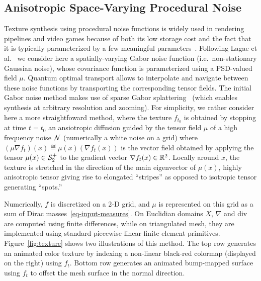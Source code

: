 
\subsection{Anisotropic Space-Varying Procedural Noise}




Texture synthesis using procedural noise functions is widely used in rendering pipelines and video games because of both its low storage cost and the fact that it is typically parameterized by a few meaningful parameters~\cite{LagaeSurvey}. 
%
Following Lagae et al.~ we consider here a spatially-varying Gabor noise function (i.e.\ non-stationary Gaussian noise), whose covariance function is parameterized using a PSD-valued field $\mu$. 
%
Quantum optimal transport allows to interpolate and navigate between these noise functions by transporting the corresponding tensor fields. 
%
The initial Gabor noise method makes use of sparse Gabor splattering~\cite{LagaeSurvey} (which enables synthesis at arbitrary resolution and zooming). For simplicity, we rather consider here a more straightfoward method, where the texture $f_{t_0}$ is obtained by stopping at time $t=t_0$ an ansiotropic diffusion guided by the tensor field $\mu$  of a high frequency noise $\mathcal{N}$ (numerically a white noise on a grid)
where $(\mu \nabla f_t)(x) \eqdef \mu(x) (\nabla f_t(x))$ is the vector field obtained by applying the tensor $\mu(x) \in \mathcal{S}_2^+$ to the gradient vector $\nabla f_t(x) \in \mathbb{R}^2$. 
%
Locally around $x$, the texture is stretched in the direction of the main eigenvector of $\mu(x)$,  highly anisotropic tensor giving rise to elongated ``stripes'' as opposed to isotropic tensor generating ``spots.''

Numerically, $f$ is discretized on a 2-D grid, and $\mu$ is represented on this grid as a sum of Dirac masses~\eqref{eq-input-measures}. On Euclidian domains $X$, $\nabla$ and div are computed using finite differences, while on triangulated mesh, they are implemented using standard piecewise-linear finite element primitives. 
%
Figure~\ref{fig:texture} shows two illustrations of this method. The top row generates an animated color texture by indexing a non-linear black-red colormap (displayed on the right) using $f_t$. Bottom row generates an animated bump-mapped surface using $f_t$ to offset the mesh surface in the normal direction. 



